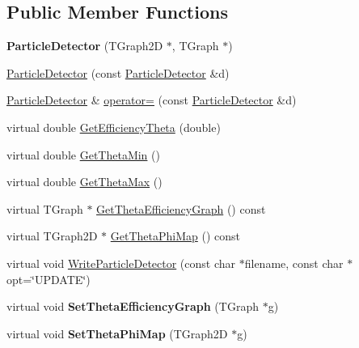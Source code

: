 \subsection*{Public Member Functions}
\begin{DoxyCompactItemize}
\item 
\hypertarget{classParticleDetector_a13be1b713dc004d1a739306bb7094f19}{{\bfseries Particle\-Detector} (T\-Graph2\-D $\ast$, T\-Graph $\ast$)}\label{classParticleDetector_a13be1b713dc004d1a739306bb7094f19}

\item 
\hyperlink{classParticleDetector_ae4e67f0c8345fdc41aae3773b7207c32}{Particle\-Detector} (const \hyperlink{classParticleDetector}{Particle\-Detector} \&d)
\item 
\hyperlink{classParticleDetector}{Particle\-Detector} \& \hyperlink{classParticleDetector_aa0f3176c3ce050c7922631d14e4917b4}{operator=} (const \hyperlink{classParticleDetector}{Particle\-Detector} \&d)
\item 
virtual double \hyperlink{classParticleDetector_aaa0f7a2570187065fa058686fc5a8d47}{Get\-Efficiency\-Theta} (double)
\item 
virtual double \hyperlink{classParticleDetector_a67d7e51f3c565dd6cff3ff0225bd6572}{Get\-Theta\-Min} ()
\item 
virtual double \hyperlink{classParticleDetector_ad0380f4df4bbbaf307b4b475b337dd5b}{Get\-Theta\-Max} ()
\item 
virtual T\-Graph $\ast$ \hyperlink{classParticleDetector_ac5a51358fe30bfcef1a48da8930da4ea}{Get\-Theta\-Efficiency\-Graph} () const 
\item 
virtual T\-Graph2\-D $\ast$ \hyperlink{classParticleDetector_aa5bc9115da65668ec8a2027f79dd0902}{Get\-Theta\-Phi\-Map} () const 
\item 
virtual void \hyperlink{classParticleDetector_a8f27064544d26812431e508fefdf4945}{Write\-Particle\-Detector} (const char $\ast$filename, const char $\ast$opt=\char`\"{}U\-P\-D\-A\-T\-E\char`\"{})
\item 
\hypertarget{classParticleDetector_a584af6669661283d25ce0037d665fa55}{virtual void {\bfseries Set\-Theta\-Efficiency\-Graph} (T\-Graph $\ast$g)}\label{classParticleDetector_a584af6669661283d25ce0037d665fa55}

\item 
\hypertarget{classParticleDetector_a4db10eaa6c269a84041ac9c59f8cd39c}{virtual void {\bfseries Set\-Theta\-Phi\-Map} (T\-Graph2\-D $\ast$g)}\label{classParticleDetector_a4db10eaa6c269a84041ac9c59f8cd39c}

\end{DoxyCompactItemize}
